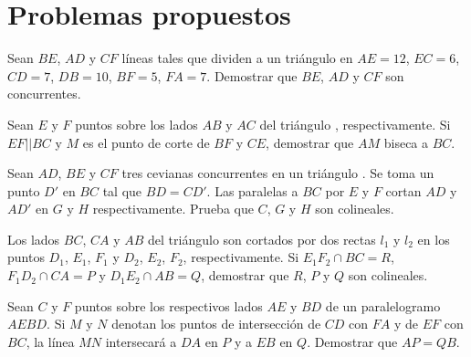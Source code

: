 \section{Problemas propuestos}

\begin{section-problem}
    Sean $BE$, $AD$ y $CF$ líneas tales que dividen a un triángulo en $AE = 12$, $EC = 6$, $CD = 7$, $DB = 10$, $BF = 5$, $FA = 7$.
    Demostrar que $BE$, $AD$ y $CF$ son concurrentes.
\end{section-problem}

\begin{section-problem}
    Sean $E$ y $F$ puntos sobre los lados $AB$ y $AC$ del triángulo , respectivamente.
    Si $EF || BC$ y $M$ es el punto de corte de $BF$ y $CE$, demostrar que $AM$ biseca a $BC$.
\end{section-problem}

\begin{section-problem}
    Sean $AD$, $BE$ y $CF$ tres cevianas concurrentes en un triángulo .
    Se toma un punto $D'$ en $BC$ tal que $BD = CD'$.
    Las paralelas a $BC$ por $E$ y $F$ cortan $AD$ y $AD'$ en $G$ y $H$ respectivamente.
    Prueba que $C$, $G$ y $H$ son colineales.
\end{section-problem}

\begin{section-problem}
    Los lados $BC$, $CA$ y $AB$ del triángulo  son cortados por dos rectas $l_1$ y $l_2$ en los puntos $D_1$, $E_1$, $F_1$ y $D_2$, $E_2$, $F_2$, respectivamente.
    Si $E_1 F_2 \cap BC = R$, $F_1 D_2 \cap CA = P$ y $D_1 E_2 \cap AB = Q$, demostrar que $R$, $P$ y $Q$ son colineales.
\end{section-problem}

\begin{section-problem}
    Sean $C$ y $F$ puntos sobre los respectivos lados $AE$ y $BD$ de un paralelogramo $AEBD$.
    Si $M$ y $N$ denotan los puntos de intersección de $CD$ con $FA$ y de $EF$ con $BC$, la línea $MN$ intersecará a $DA$ en $P$ y a $EB$ en $Q$.
    Demostrar que $AP = QB$.
\end{section-problem}

